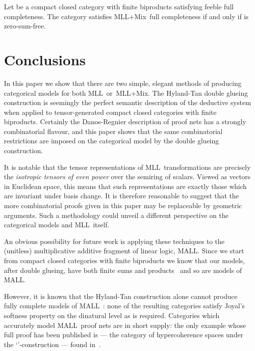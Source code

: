 \documentclass{LMCS}
\theoremstyle{plain}\newtheorem*{cLm}{Claim}
\newcommand{\mll}{MLL} \newcommand{\mall}{MALL}
\newcommand{\mllmix}{MLL+Mix} \newcommand{\GRel}{\mathbf{GRel}}
\newcommand{\p}{} \newcommand{\N}{\mathbb{N}}
\begin{document}
   
    \begin{cor}
    Let  be a compact closed category with finite biproducts satisfying feeble full completeness. The category  satisfies \mllmix~full completeness if and only if  is zero-sum-free.
    \end{cor}
    
\section{Conclusions}

In this paper we show that there are two simple, elegant methods
of producing categorical models for both \mll\ or~\mllmix. The
Hyland-Tan double glueing construction is seemingly the perfect
semantic description of the deductive system when applied to
tensor-generated compact closed categories with finite biproducts. 
Certainly the Danos-Regnier description of proof nets has a strongly
combinatorial flavour, and this paper shows that the same
combinatorial restrictions are imposed on the
categorical model by the double glueing construction.

\p It is notable that the tensor representations of \mll\
transformations are precisely the \emph{isotropic tensors of even
power} over the semiring of scalars. Viewed as vectors in Euclidean space, this means that such representations are exactly those which are invariant under basis change. It is therefore reasonable to suggest that the more combinatorial proofs given in this paper may be replaceable by geometric arguments. Such a methodology could unveil a different perspective on the categorical models and \mll\ itself.

\p An obvious possibility for future work is applying these techniques
to the (unitless) multiplicative additive fragment of linear logic,
\mall. Since we start from compact closed categories with finite
biproducts we know that our models, after double glueing, have both
finite sums and products~\cite{HS03} and so are models of \mall.

\p However, it is known that the Hyland-Tan construction alone cannot
produce fully complete models of \mall~\cite{Ste13}: none of the
resulting categories satisfy Joyal's softness property on the
dinatural level as is required. Categories which accurately model
\mall~proof nets are in short supply: the only example whose full proof has been published is  --- the category of hypercoherence spaces under the `'-construction --- found in~\cite{BHS05}.
\end{document}
